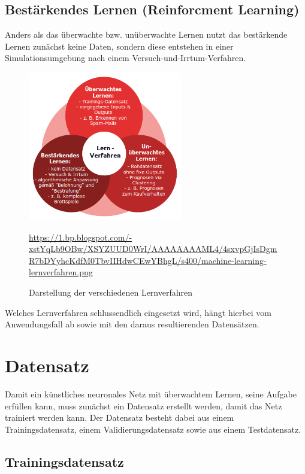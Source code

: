 \subsection{Bestärkendes Lernen (Reinforcment Learning)}

	Anders als das überwachte bzw. unüberwachte Lernen nutzt das bestärkende Lernen zunächst keine Daten, sondern diese entstehen in einer Simulationsumgebung nach einem Versuch-und-Irrtum-Verfahren. \cite{der-onliner_blogspot}
	
\begin{figure}[H]
	\centering
	\includegraphics[width=0.6\textwidth]{kapitel3/images/lernverfahren.png}
	\label{fig:machine-learning-algorithms}
	\caption{Darstellung der verschiedenen Lernverfahren}
	\vspace{0.2cm}
	\quelle\url{https://1.bp.blogspot.com/-xstYqLb9OBw/XSYZUUD0WrI/AAAAAAAAML4/4sxvpGjIsDgmR7bDYyhcKdfM0TbvIIHdwCEwYBhgL/s400/machine-learning-lernverfahren.png}
\end{figure}

Welches Lernverfahren schlussendlich eingesetzt wird, hängt hierbei vom Anwendungsfall ab sowie mit den daraus resultierenden Datensätzen.

\section{Datensatz}

Damit ein künstliches neuronales Netz mit überwachtem Lernen, seine Aufgabe erfüllen kann, muss zunächst ein Datensatz erstellt werden, damit das Netz trainiert werden kann. Der Datensatz besteht dabei aus einem Trainingsdatensatz, einem Validierungsdatensatz sowie aus einem Testdatensatz. \\

\subsection{Trainingsdatensatz}

